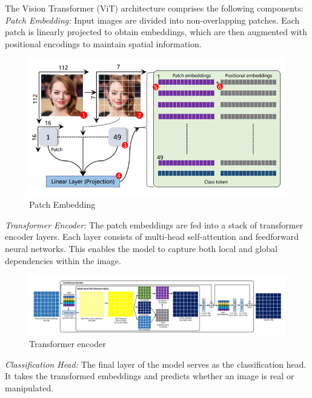 \noindent The Vision Transformer (ViT) architecture comprises the following components:
\\

\noindent \textit{Patch Embedding:} Input images are divided into non-overlapping patches. Each patch is linearly projected to obtain embeddings, which are then augmented with positional encodings to maintain spatial information.
\\
\begin{figure}[h]
    \centering
    \includegraphics[width=6in]{img/patchembedding.jpg}
    \caption{Patch Embedding}
\end{figure}

\noindent \textit{Transformer Encoder:} The patch embeddings are fed into a stack of transformer encoder layers. Each layer consists of multi-head self-attention and feedforward neural networks. This enables the model to capture both local and global dependencies within the image.
\\
\begin{figure}[h]
    \centering
    \includegraphics[width=6in]{img/encoderdetails.jpg}
    \caption{Transformer encoder}
\end{figure}
\newpage
\noindent \textit{Classification Head:} The final layer of the model serves as the classification head. It takes the transformed embeddings and predicts whether an image is real or manipulated.
\\

